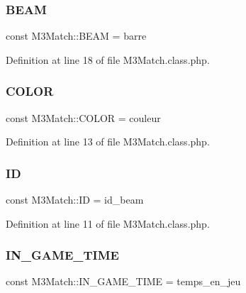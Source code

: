 \subsubsection{\texorpdfstring{B\+E\+AM}{BEAM}}
{\footnotesize\ttfamily const M3\+Match\+::\+B\+E\+AM = \textquotesingle{}barre\textquotesingle{}}



Definition at line 18 of file M3\+Match.\+class.\+php.

\mbox{\label{class_m3_match_af9f5951d2a099aa635eaedc9393862d2}} 
\subsubsection{\texorpdfstring{C\+O\+L\+OR}{COLOR}}
{\footnotesize\ttfamily const M3\+Match\+::\+C\+O\+L\+OR = \textquotesingle{}couleur\textquotesingle{}}



Definition at line 13 of file M3\+Match.\+class.\+php.

\mbox{\label{class_m3_match_afc06a8237711e300cc4f52456f0f37b0}} 
\subsubsection{\texorpdfstring{ID}{ID}}
{\footnotesize\ttfamily const M3\+Match\+::\+ID = \textquotesingle{}id\+\_\+beam\textquotesingle{}}



Definition at line 11 of file M3\+Match.\+class.\+php.

\mbox{\label{class_m3_match_a11e3ca3d3285baad83fa0422b2a5c2eb}} 
\subsubsection{\texorpdfstring{I\+N\+\_\+\+G\+A\+M\+E\+\_\+\+T\+I\+ME}{IN\_GAME\_TIME}}
{\footnotesize\ttfamily const M3\+Match\+::\+I\+N\+\_\+\+G\+A\+M\+E\+\_\+\+T\+I\+ME = \textquotesingle{}temps\+\_\+en\+\_\+jeu\textquotesingle{}}



